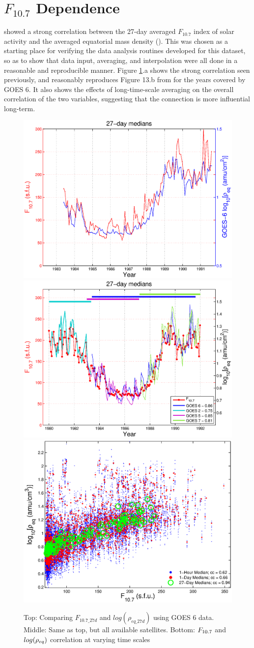 \section{$F_{10.7}$ Dependence}
\cite{Takahashi2010SolarCycleVariation} showed a strong correlation between the 27-day averaged $F_{10.7}$ index of solar activity and the averaged equatorial mass density (\req). This was chosen as a starting place for verifying the data analysis routines developed for this dataset, so as to show that data input, averaging, and interpolation were all done in a reasonable and reproducible manner. Figure \ref{fig:F107rhoeq27dcomparison}.a shows the strong correlation seen previously, and reasonably reproduces Figure 13.b from \cite{Takahashi2010SolarCycleVariation} for the years covered by GOES 6. It also shows the effects of long-time-scale averaging on the overall correlation of the two variables, suggesting that the connection is more influential long-term.

\begin{figure}[htp!]
	\centering
	\includegraphics[width=0.55\linewidth]{Figures/F107MD27d-GOES6}
		\includegraphics[width=0.55\linewidth]{Figures/F107MD27d-all}
	\includegraphics[width=0.55\linewidth]{Figures/ccplot-GOES6}
	\caption{Top: Comparing $F_{10.7\_27d}$ and $log(\rho_{eq\_27d})$ using GOES 6 data. Middle: Same as top, but all available satellites. Bottom: $F_{10.7}$ and $log(\rho_{eq})$ correlation at varying time scales}
	\label{fig:F107rhoeq27dcomparison}
\end{figure}

